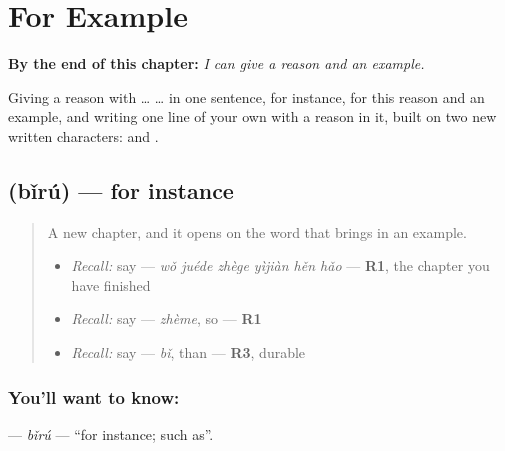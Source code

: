 
\chapter{For Example}
\label{ch:zh-for-example}

\begin{chapteropening}
\textbf{By the end of this chapter:} \emph{I can give a reason and an example.}

Giving a reason with  …  … in one sentence, for instance, for this reason and an example, and writing one line of your own with a reason in it, built on two new written characters:  and .
\end{chapteropening}

\section[\texorpdfstring{\zh{比如} (bǐrú)}{比如 (bǐrú)}]{ (bǐrú) — for instance}

\label{lesson:ZH-C281-biru}



\begin{quote}
A new chapter, and it opens on the word that brings in an example.

\begin{itemize}
\raggedright
  \item \emph{Recall:} say  — \emph{wǒ juéde zhège yìjiàn hěn hǎo} — \textbf{R1}, the chapter you have finished
  \item \emph{Recall:} say  — \emph{zhème}, so — \textbf{R1}
  \item \emph{Recall:} say  — \emph{bǐ}, than — \textbf{R3}, durable
\end{itemize}
\end{quote}

\subsection*{You'll want to know: }
\textbf{} — \emph{bǐrú} — \textquotedblleft{}for instance; such as\textquotedblright{}.

